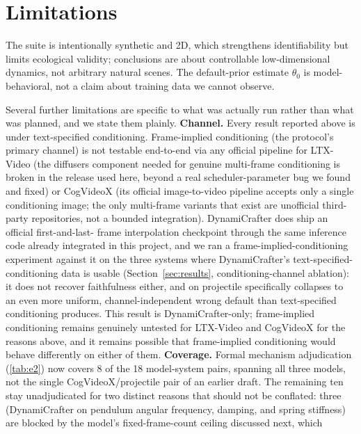 \documentclass[10pt,twocolumn,letterpaper]{article}
\begin{document}
\section{Limitations}
\label{sec:limitations}
The suite is intentionally synthetic and 2D, which strengthens identifiability
but limits ecological validity; conclusions are about controllable
low-dimensional dynamics, not arbitrary natural scenes. The default-prior
estimate $\theta_0$ is model-behavioral, not a claim about training data we
cannot observe.

Several further limitations are specific to what was actually run rather than
what was planned, and we state them plainly. \textbf{Channel.} Every result
reported above is under text-specified conditioning. Frame-implied conditioning
(the protocol's primary channel) is not testable end-to-end via any official
pipeline for LTX-Video (the diffusers component needed for genuine
multi-frame conditioning is broken in the release used here, beyond a real
scheduler-parameter bug we found and fixed) or CogVideoX (its official
image-to-video pipeline accepts only a single conditioning image; the only
multi-frame variants that exist are unofficial third-party repositories, not
a bounded integration). DynamiCrafter does ship an official first-and-last-
frame interpolation checkpoint through the same inference code already
integrated in this project, and we ran a frame-implied-conditioning experiment against it on the
three systems where DynamiCrafter's text-specified-conditioning data is usable
(Section~\ref{sec:results}, conditioning-channel ablation): it does not recover faithfulness either,
and on projectile specifically collapses to an even more uniform,
channel-independent wrong default than text-specified conditioning produces. This result is
DynamiCrafter-only; frame-implied conditioning remains genuinely untested for LTX-Video and
CogVideoX for the reasons above, and it remains possible that
frame-implied conditioning would behave differently on either of them.
\textbf{Coverage.}
Formal mechanism adjudication (\autoref{tab:e2}) now covers 8 of the 18
model-system pairs, spanning all three models, not the single
CogVideoX/projectile pair of an earlier draft. The remaining ten stay
unadjudicated for two distinct reasons that should not be conflated: three
(DynamiCrafter on pendulum angular frequency, damping, and spring stiffness)
are blocked by the model's fixed-frame-count ceiling discussed next, which
\end{document}
